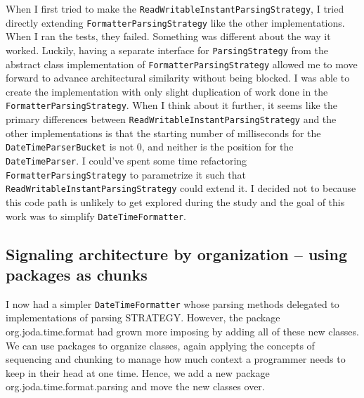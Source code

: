 When I first tried to make the \texttt{ReadWritableInstantParsingStrategy}, I tried directly extending \texttt{FormatterParsingStrategy} like the other implementations. When I ran the tests, they failed. Something was different about the way it worked. Luckily, having a separate interface for \texttt{ParsingStrategy} from the abstract class implementation of \texttt{FormatterParsingStrategy} allowed me to move forward to advance architectural similarity without being blocked. I was able to create the implementation with only slight duplication of work done in the \texttt{FormatterParsingStrategy}. When I think about it further, it seems like the primary differences between \texttt{ReadWritableInstantParsingStrategy} and the other implementations is that the starting number of milliseconds for the \texttt{DateTimeParserBucket} is not 0, and neither is the position for the \texttt{DateTimeParser}. I could’ve spent some time refactoring \texttt{FormatterParsingStrategy} to parametrize it such that \texttt{ReadWritableInstantParsingStrategy} could extend it. I decided not to because this code path is unlikely to get explored during the study and the goal of this work was to simplify \texttt{DateTimeFormatter}.

\subsection{Signaling architecture by organization -- using packages as chunks}

I now had a simpler \texttt{DateTimeFormatter} whose parsing methods delegated to implementations of parsing STRATEGY. However, the package org.joda.time.format had grown more imposing by adding all of these new classes. We can use packages to organize classes, again applying the concepts of sequencing and chunking to manage how much context a programmer needs to keep in their head at one time. Hence, we add a new package org.joda.time.format.parsing and move the new classes over.


